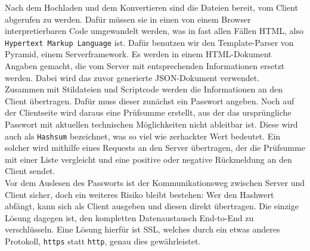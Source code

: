 Nach dem Hochladen und dem Konvertieren sind die Dateien bereit, vom Client abgerufen zu werden. Dafür müssen sie in einen von einem Browser interpretierbaren Code umgewandelt werden, was in fast allen Fällen HTML, also \texttt{Hypertext Markup Language} ist. Dafür benutzen wir den Template-Parser von Pyramid, einem Serverframework. Es werden in einem HTML-Dokument Angaben gemacht, die vom Server mit entsprechenden Informationen ersetzt werden. Dabei wird das zuvor generierte JSON-Dokument verwendet.\\

Zusammen mit Stildateien und Scriptcode werden die Informationen an den Client übertragen. Dafür muss dieser zunächst ein Passwort angeben. Noch auf der Clientseite wird daraus eine Prüfsumme erstellt, aus der das ursprüngliche Passwort mit aktuellen technischen Möglichkeiten nicht ableitbar ist. Diese wird auch als \texttt{Hashsum} bezeichnet, was so viel wie \glqq zerhackter Wert \grqq bedeutet. Ein solcher wird mithilfe eines Requests an den Server übertragen, der die Prüfsumme mit einer Liste vergleicht und eine positive oder negative Rückmeldung an den Client sendet.\\

Vor dem Auslesen des Passworts ist der Kommunikationsweg zwischen Server und Client sicher, doch ein weiteres Risiko bleibt bestehen: Wer den Hashwert abfängt, kann sich als Client ausgeben und diesen direkt übertragen. Die einzige Lösung dagegen ist, den kompletten Datenaustausch End-to-End zu verschlüsseln. Eine Lösung hierfür ist SSL, welches durch ein etwas  anderes Protokoll, \texttt{https} statt \texttt{http}, genau dies gewährleistet.